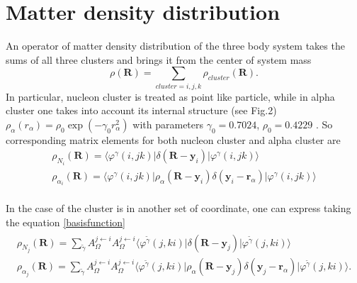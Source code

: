 \documentclass[
11pt, %
english, %
onehalfspacing, %
headsepline, %
]{MastersDoctoralThesis} %
\begin{document}
\section{Matter  density distribution}

An operator of matter density distribution of the three body system takes the sums of all three clusters and brings it from the center of  system mass 
\begin{equation}
\rho(\textbf{R})=\sum_{\scriptscriptstyle{cluster}=i,j,k} \rho_{\scriptscriptstyle cluster}(\textbf{R}) .
\end{equation}
In particular,  nucleon cluster is treated as point like particle, while in alpha cluster  one takes into account its internal structure  (see Fig.2)  $ \displaystyle \rho_\alpha(r_{\alpha})=\rho_0 \exp\left(-\gamma_0 r^2_{\alpha} \right)$ with parameters $ \displaystyle \gamma_0= 0.7024$, $  \displaystyle \rho_0=0.4229$ \cite{SATCHLER1979}. So corresponding matrix elements for both nucleon cluster and alpha cluster are
\begin{equation}
\label{densities}
\begin{gathered}
\rho_{N_i}(\textbf{R})=
\langle\varphi^{{\gamma}}(i,jk) 
\vert \delta(\textbf{R}-\textbf{y}_i)
\vert \varphi^{{\gamma}}(i,jk)\rangle \\
\rho_{\alpha_i}(\textbf{R})= 
\langle\varphi^{{\gamma}}(i,jk) 
\vert \rho_{\alpha}(\textbf{R}-\textbf{y}_i) \delta(\textbf{y}_i-\textbf{r}_\alpha)
\vert \varphi^{{\gamma}}(i,jk)\rangle \\
\end{gathered}
\end{equation}


In the case of the cluster is in another set of coordinate, one can express taking the equation \eqref{basisfunction}
\begin{align*}
\begin{gathered}
\rho_{N_j}(\textbf{R})=
\sum_{  \widetilde{ \gamma }     } A_{\Omega}^{j \leftarrow i}  A_{\Omega}^{j \leftarrow i} 
\langle \varphi^{ \widetilde{\gamma} }(j,ki) 
\vert \delta(\textbf{R}-\textbf{y}_j)
\vert \varphi^{\widetilde{\gamma}}(j,ki)\rangle \\
\rho_{\alpha_j}(\textbf{R})= 
\sum_{  \widetilde{ \gamma }     } A_{\Omega}^{j \leftarrow i}  A_{\Omega}^{j \leftarrow i} 
\langle \varphi^{ \widetilde{\gamma} }(j,ki) 
\vert \rho_{\alpha}(\textbf{R}-\textbf{y}_j) \delta(\textbf{y}_j-\textbf{r}_{\alpha})
\vert \varphi^{\widetilde{\gamma}}(j,ki)\rangle.\\
\end{gathered}
\end{align*}
\end{document}

